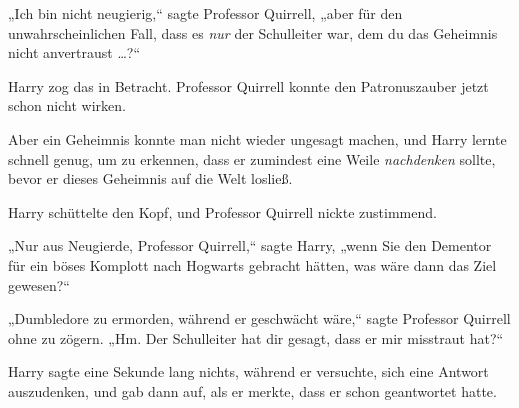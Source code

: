 „Ich bin nicht neugierig,“ sagte Professor Quirrell, „aber für den unwahrscheinlichen Fall, dass es \emph{nur} der Schulleiter war, dem du das Geheimnis nicht anvertraust …?“

Harry zog das in Betracht. Professor Quirrell konnte den Patronuszauber jetzt schon nicht wirken.

Aber ein Geheimnis konnte man nicht wieder ungesagt machen, und Harry lernte schnell genug, um zu erkennen, dass er zumindest eine Weile \emph{nachdenken} sollte, bevor er dieses Geheimnis auf die Welt losließ.

Harry schüttelte den Kopf, und Professor Quirrell nickte zustimmend.

„Nur aus Neugierde, Professor Quirrell,“ sagte Harry, „wenn Sie den Dementor für ein böses Komplott nach Hogwarts gebracht hätten, was wäre dann das Ziel gewesen?“

„Dumbledore zu ermorden, während er geschwächt wäre,“ sagte Professor Quirrell ohne zu zögern. „Hm. Der Schulleiter hat dir gesagt, dass er mir misstraut hat?“

Harry sagte eine Sekunde lang nichts, während er versuchte, sich eine Antwort auszudenken, und gab dann auf, als er merkte, dass er schon geantwortet hatte.

